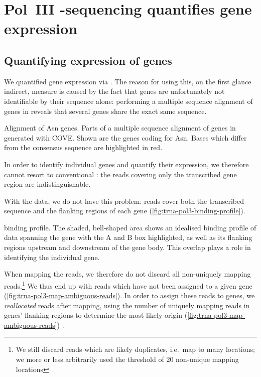 \chapter{Pol~III -sequencing quantifies  gene
expression}
\label{sec:chip}

\section{Quantifying expression of \trna genes}

We quantified \trna gene expression via  \chipseq. The reason for using
this, on the first glance indirect, measure is caused by the fact that \trna
genes are unfortunately not identifiable by their sequence alone: performing a
multiple sequence alignment of \trna genes in \mmu reveals that several \trna
genes share the exact same sequence.

    {\footnotesize
    }
    {Alignment of Asn \trna genes.}
    {Parts of a multiple sequence alignment of \trna genes in \mmu generated
    with COVE\@. Shown are the \trna genes coding for Asn. Bases which differ
    from the consensus sequence are highlighted in red.}

In order to identify individual \trna genes and quantify their expression, we
therefore cannot resort to conventional \rnaseq: the \rna reads covering only
the transcribed gene region are indistinguishable.

With the  \chipseq data, we do not have this problem: reads cover both the
transcribed sequence and the flanking regions of each gene
(\cref{fig:trna-pol3-binding-profile}).

    {\trna {} \chip binding profile.}
    {The shaded, bell-shaped area shows an idealised binding profile of \chipseq
    data spanning the \trna gene with the A and B box highlighted, as well as
    its flanking regions upstream and downstream of the gene body. This overlap
    plays a role in identifying the individual gene.}

When mapping the reads, we therefore do not discard all non-uniquely mapping
reads.\footnote{We still discard reads which are likely \pcr duplicates, i.e.\
map to many locations; we more or less arbitrarily used the threshold of
\num{20} non-unique mapping locations} We thus end up with reads which have not
been assigned to a given \trna gene (\cref{fig:trna-pol3-map-ambiguous-reads}).
In order to assign these reads to \trna genes, we \emph{reallocated} reads after
mapping, using the number of uniquely mapping reads in \trna genes’ flanking
regions to determine the most likely origin
(\cref{fig:trna-pol3-map-ambiguous-reads}) \citep{Kutter:2011}.

